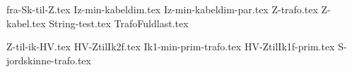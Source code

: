 \usepackage[utf8]{inputenc}%
\usepackage{amsmath}%
\usepackage{mathtools}%
\usepackage{icomma}%
\usepackage{siunitx}%
\usepackage{fp}%
\usepackage{xstring}%
\usepackage{listofitems}
\usepackage{ifthen}
\usepackage{gensymb} %

{fra-Sk-til-Z.tex}
{Iz-min-kabeldim.tex}
{Iz-min-kabeldim-par.tex}
{Z-trafo.tex}
{Z-kabel.tex}
{String-test.tex}
{TrafoFuldlast.tex}

{Z-til-ik-HV.tex}
{HV-ZtilIk2f.tex}
{Ik1-min-prim-trafo.tex}
{HV-ZtilIk1f-prim.tex}
{S-jordskinne-trafo.tex}


